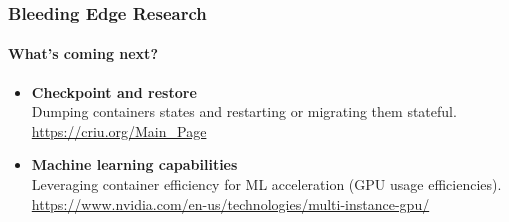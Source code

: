 \begin{frame}
    \frametitle{Bleeding Edge Research}
    \framesubtitle{What's coming next?}
    \begin{itemize}
        \item \textbf{Checkpoint and restore}\\
        Dumping containers states and restarting or migrating them stateful.\\
        \url{https://criu.org/Main_Page}\newline
        \item \textbf{Machine learning capabilities}\\
        Leveraging container efficiency for ML acceleration (GPU usage efficiencies).\\
        \url{https://www.nvidia.com/en-us/technologies/multi-instance-gpu/}
    \end{itemize}
\end{frame}